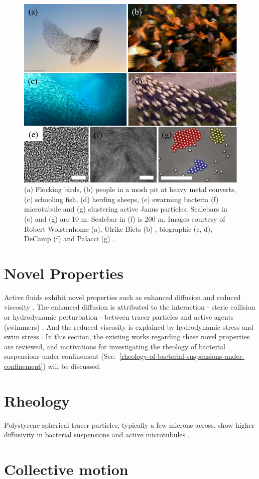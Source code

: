 \begin{figure}[!htbp]
	\begin{center}
	\includegraphics[width=5.5 in]{Figs/1-Intro/1.pdf}
	\end{center}
	\caption[Figure 1.1: Examples of living matters and active fluids.]
	{
  (a) Flocking birds, (b) people in a mosh pit at heavy metal converts, (c) schooling fish, (d) herding sheeps, (e) swarming bacteria (f) microtubule and (g) clustering active Janus particles.
  Scalebars in (e) and (g) are 10 \textmu m. Scalebar in (f) is 200 \textmu m. Images courtesy of Robert Wolstenhome (a), Ulrike Biets (b) \cite{Silverberg2013}, biographic (c, d), DeCamp (f) \cite{DeCamp2015} and Palacci (g) \cite{Palacci2013}.
	}
	\label{}
\end{figure}






\section{Novel Properties}
\label{emergent-properties}
Active fluids exhibit novel properties such as enhanced diffusion and reduced viscosity \cite{Ramaswamy2010}. The enhanced diffusion is attributed to the interaction - steric collision or hydrodynamic perturbation - between tracer particles and active agents (swimmers)
\cite{Wu2000, Peng2016, Caspi2000, Morozov2014, Patteson2016, Leptos2009,
 Yang2016, Valeriani2011, Kurtuldu2011}.
And the reduced viscosity is explained by hydrodynamic stress and swim stress \cite{}. In this section, the existing works regarding these novel properties are reviewed, and motivations for investigating the rheology of bacterial suspensions under confinement (Sec.~\ref{rheology-of-bacterial-suspensions-under-confinement}) will be discussed.


\section{Rheology}
Polystyrene spherical tracer particles, typically a few microns across, show higher diffusivity in bacterial suspensions and active microtubules \cite{Wu2000, Caspi2000}.

\section{Collective motion}
